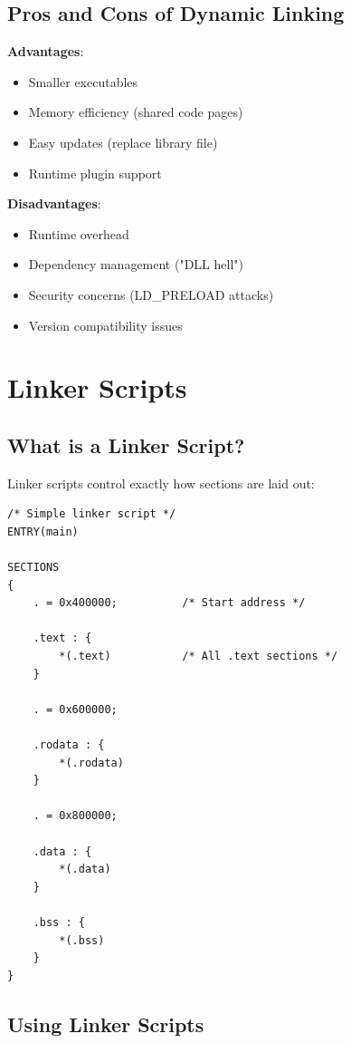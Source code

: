 \subsection{Pros and Cons of Dynamic Linking}

\textbf{Advantages}:
\begin{itemize}
    \item Smaller executables
    \item Memory efficiency (shared code pages)
    \item Easy updates (replace library file)
    \item Runtime plugin support
\end{itemize}

\textbf{Disadvantages}:
\begin{itemize}
    \item Runtime overhead
    \item Dependency management ("DLL hell")
    \item Security concerns (LD\_PRELOAD attacks)
    \item Version compatibility issues
\end{itemize}

\section{Linker Scripts}

\subsection{What is a Linker Script?}

Linker scripts control exactly how sections are laid out:

\begin{lstlisting}[language=ld]
/* Simple linker script */
ENTRY(main)

SECTIONS
{
    . = 0x400000;          /* Start address */

    .text : {
        *(.text)           /* All .text sections */
    }

    . = 0x600000;

    .rodata : {
        *(.rodata)
    }

    . = 0x800000;

    .data : {
        *(.data)
    }

    .bss : {
        *(.bss)
    }
}
\end{lstlisting}

\subsection{Using Linker Scripts}

